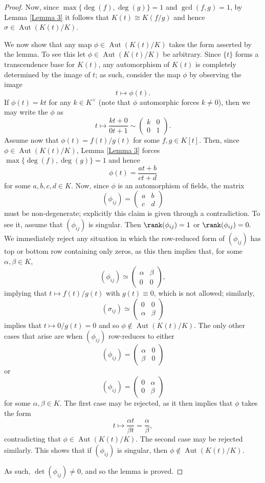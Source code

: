 \documentclass[10pt]{article}
\DeclareMathOperator{\aut}{Aut}
\DeclareMathOperator{\aut}{rank}
\numberwithin{Theorem}{section}
\begin{document}
\begin{proof}
Now, since $\max\lbrace \deg(f),\deg(g) \rbrace = 1$ and $\gcd(f,g) =1 $, by Lemma \ref{Lemma 3} it follows that $K(t) \cong K(f/g)$ and hence $\sigma \in \aut(K(t)/K)$. 

We now show that any map $\phi \in \aut(K(t)/K)$ takes the form asserted by the lemma. To see this let $\phi \in \aut(K(t)/K)$ be arbitrary. Since $\lbrace t \rbrace$ forms a transcendence base for $K(t)$, any automorphism of $K(t)$ is completely determined by the image of $t$; as such, consider the map $\phi$ by observing the image
$$ t \mapsto \phi(t).$$
If $\phi(t) = kt$ for any $k \in K^{\times}$ (note that $\phi$ automorphic forces $k \ne 0$), then we may write the $\phi$ as
\[ 
t \mapsto \frac{kt + 0}{0t + 1} \sim \begin{pmatrix}
k & 0 \\
0 & 1
\end{pmatrix}.
\]
Assume now that $\phi(t) = f(t)/g(t)$ for some $f, g \in K[t]$. Then, since $\phi \in \aut(K(t)/K)$, Lemma \ref{Lemma 3} forces $\max\lbrace \deg(f),\deg(g)\rbrace = 1$ and hence
$$ \phi(t) = \frac{at+ b}{ct + d}$$
for some $a,b,c,d \in K$. Now, since $\phi$ is an automorphism of fields, the matrix
\[ 
(\phi_{ij}) = \begin{pmatrix}
a & b \\
c & d
\end{pmatrix} 
\]
must be non-degenerate; explicitly this claim is given through a contradiction. To see it, assume that $(\phi_{ij})$ is singular. Then $\rank(\phi_{ij}) = 1$ or $\rank(\phi_{ij}) = 0.$ We immediately reject any situation in which the row-reduced form of $(\phi_{ij})$ has top or bottom row containing only zeros, as this then implies that, for some $\alpha, \beta \in K$, 
\[
 (\phi_{ij}) \simeq \begin{pmatrix}
\alpha & \beta \\
0 & 0
\end{pmatrix},
\]
implying that $t \mapsto f(t)/g(t)$ with $g(t) \equiv 0$, which is not allowed; similarly, 
\[
(\sigma_{ij}) \simeq \begin{pmatrix}
0 & 0 \\
\alpha & \beta
\end{pmatrix}
\]
implies that $t \mapsto 0/g(t) = 0$ and so $\phi \notin \aut(K(t)/K)$. The only other cases that arise are when $(\phi_{ij})$ row-reduces to either
\[
 (\phi_{ij}) = \begin{pmatrix}
\alpha & 0 \\
\beta & 0
\end{pmatrix}
\]
or
\[
 (\phi_{ij}) = \begin{pmatrix}
0 & \alpha \\
0 & \beta
\end{pmatrix}
\]
for some $\alpha, \beta \in K$. The first case may be rejected, as it then implies that $\phi$ takes the form
$$ t \mapsto \frac{\alpha t}{\beta t} = \frac{\alpha}{\beta},$$
contradicting that $\phi \in \aut(K(t)/K)$. The second case may be rejected similarly. This shows that if $(\phi_{ij})$ is singular, then $\phi \notin \aut(K(t)/K)$. 

As such, $\det(\phi_{ij}) \ne 0$, and so the lemma is proved.
\end{proof}
\end{document}
